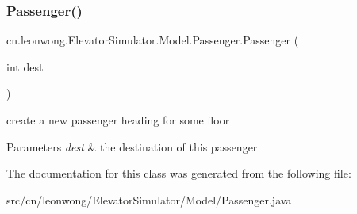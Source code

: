 \subsubsection{\texorpdfstring{Passenger()}{Passenger()}}
{\footnotesize\ttfamily cn.\+leonwong.\+Elevator\+Simulator.\+Model.\+Passenger.\+Passenger (\begin{DoxyParamCaption}\item[{int}]{dest }\end{DoxyParamCaption})}

create a new passenger heading for some floor 
\begin{DoxyParams}{Parameters}
{\em dest} & the destination of this passenger \\
\hline
\end{DoxyParams}


The documentation for this class was generated from the following file\+:\begin{DoxyCompactItemize}
\item 
src/cn/leonwong/\+Elevator\+Simulator/\+Model/Passenger.\+java\end{DoxyCompactItemize}
